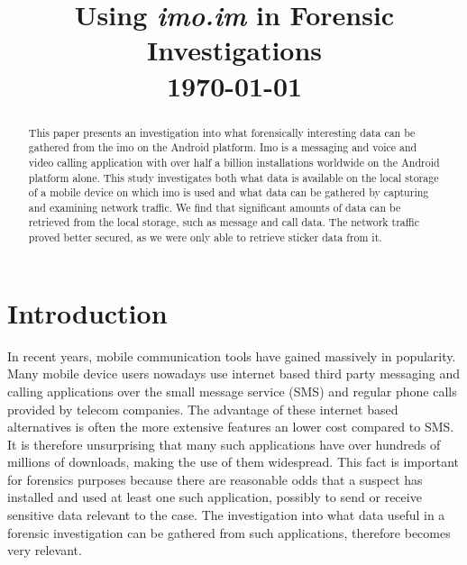 \documentclass[conference]{IEEEtran}
\begin{document}
\title{Using {\it imo.im} in Forensic Investigations \\\vspace{5mm} \large  \today}
\author{
\and
{}
}
\maketitle
\thispagestyle{plain}
\pagestyle{plain}

\begin{abstract}

    This paper presents an investigation into what forensically interesting data
    can be gathered from the imo on the Android platform. Imo is a messaging and
    voice and video calling application with over half a billion installations
    worldwide on the Android platform alone. This study investigates both what
    data is available on the local storage of a mobile device on which imo is
    used and what data can be gathered by capturing and examining network
    traffic. We find that significant amounts of data can be retrieved from the
    local storage, such as message and call data. The network traffic proved
    better secured, as we were only able to retrieve sticker data from it.

\end{abstract}

\section{Introduction}

In recent years, mobile communication tools have gained massively in popularity.
Many mobile device users nowadays use internet based third party messaging and
calling applications over the small message service (SMS) and regular phone
calls provided by telecom companies.  The advantage of these internet based
alternatives is often the more extensive features an lower cost compared to SMS.
It is therefore unsurprising that many such applications have over hundreds of
millions of downloads, making the use of them widespread. This fact is important
for forensics purposes because there are reasonable odds that a suspect has
installed and used at least one such application, possibly to send or receive
sensitive data relevant to the case. The investigation into what data useful in
a forensic investigation can be gathered from such applications, therefore
becomes very relevant.
\end{document}
